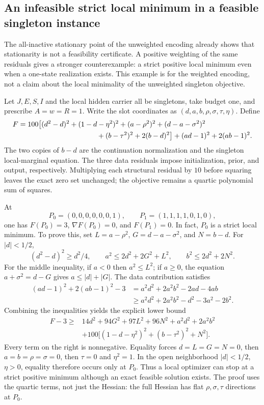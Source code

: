 \subsection{An infeasible strict local minimum in a feasible singleton instance}

The all-inactive stationary point of the unweighted encoding already shows
that stationarity is not a feasibility certificate.  A positive weighting
of the same residuals gives a stronger counterexample: a strict positive
local minimum even when a one-state realization exists.  This example is
for the weighted encoding, not a claim about the local minimality of the
unweighted singleton objective.

Let $J,E,S,I$ and the local hidden carrier all be singletons, take budget
one, and prescribe $A=w=R=1$.  Write the slot coordinates as
$(d,a,b,\rho,\sigma,\tau,\eta)$.  Define
\begin{align*}
 F={}&100\bigl[(d^2-d)^2+(1-d-\eta^2)^2
 +(a-\rho^2)^2+(d-a-\sigma^2)^2\\
 &\hspace{34mm} +(b-\tau^2)^2+2(b-d)^2\bigr]
 +(ad-1)^2+2(ab-1)^2.
\end{align*}
The two copies of $b-d$ are the continuation normalization and the
singleton local-marginal equation.  The three data residuals impose
initialization, prior, and output, respectively.  Multiplying each
structural residual by $10$ before squaring leaves the exact zero set
unchanged; the objective remains a quartic polynomial sum of squares.

At
\[
 P_0=(0,0,0,0,0,0,1),\qquad
 P_1=(1,1,1,1,0,1,0),
\]
one has $F(P_0)=3$, $\nabla F(P_0)=0$, and $F(P_1)=0$.
In fact, $P_0$ is a strict local minimum.  To prove this, set
$L=a-\rho^2$, $G=d-a-\sigma^2$, and $N=b-d$.
For $|d|<1/2$,
\[
 (d^2-d)^2\geq d^2/4,\qquad
 a^2\leq 2d^2+2G^2+L^2,\qquad
 b^2\leq 2d^2+2N^2.
\]
For the middle inequality, if $a<0$ then $a^2\leq L^2$;
if $a\geq0$, the equation $a+\sigma^2=d-G$ gives
$a\leq |d|+|G|$.  The data contribution satisfies
\begin{align*}
 (ad-1)^2+2(ab-1)^2-3
 &=a^2d^2+2a^2b^2-2ad-4ab\\
 &\geq a^2d^2+2a^2b^2-d^2-3a^2-2b^2.
\end{align*}
Combining the inequalities yields the explicit lower bound
\begin{align*}
 F-3\geq{}&14d^2+94G^2+97L^2+96N^2+a^2d^2+2a^2b^2\\
 &+100\bigl[(1-d-\eta^2)^2+(b-\tau^2)^2+N^2\bigr].
\end{align*}
Every term on the right is nonnegative.  Equality forces
$d=L=G=N=0$, then $a=b=\rho=\sigma=0$, then $\tau=0$
and $\eta^2=1$.  In the open neighborhood $|d|<1/2$, $\eta>0$,
equality therefore occurs only at $P_0$.
Thus a local optimizer can stop at a strict positive minimum although an
exact feasible solution exists.  The proof uses the quartic terms, not
just the Hessian: the full Hessian has flat $\rho,\sigma,\tau$
directions at $P_0$.

